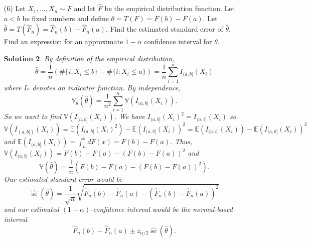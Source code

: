 \documentclass[10pt]{article}
\newtheorem*{sol}{Solution}
\newcommand{\V}{\mathbb{V}}
\newcommand{\E}{\mathbb{E}}
\newcommand{\se}{\operatorname{se}}
\newcommand{\Cov}{\operatorname{Cov}}
\begin{document}
\begin{enumerate}
\begin{sol}
We have $\Cov(\hat F_n(x), \hat F_n(y))=\frac{1}{n^2} \sum_{i,j} \Cov(Y_i, Z_j)$.
If $i\neq j$ then $Y_i$ and $Z_j$ are
independent so $\Cov(Y_i,Z_j)=0$. Otherwise, note
that $\Cov(Y_i,Z_i) = \E(Y_i Z_i) - \E(Y_i)\E(Z_i)$ and
\[
\E(Y_i) = \int I(z\leq x) dF(z) = \int_{-\infty}^x dF(z) = F(x)
\text{ and similarly }
\E(Z_i) = F(y).
\]
Without loss of generality, assume that $x<y$.
For $\E(Y_iZ_i)$, note that if $X_i>x$ then $Y_iZ_i=0$ since $Y_i=0$.
If $X_i\leq x$ then $Y_iZ_i=1$. So in fact $Y_iZ_i=Y_i$.
Thus,
\[
\Cov(Y_i,Z_i) = \E(Y_i) - \E(Y_i)\E(Z_i) = F(x) - F(x)F(y).
\]

Plugging this into our formula yields
\[
\Cov(\hat F_n(x), \hat F_n(y)) =
\begin{cases}
\frac{F(x)}{n}(1- F(y)) & x < y \\
\frac{F(y)}{n}(1-F(x)) & y > x.
\end{cases}
\]
\end{sol}

\item[(6)]
Let $X_1, \ldots, X_n \sim F$ and let $\hat F$ be the empirical distribution
function. Let $a < b$ be fixed numbers and define $\theta = T(F) = F(b) - F(a)$.
Let $\hat \theta = T(\hat F_n) = \hat F_n(b) - \hat F_n(a)$.
Find the estimated standard error of $\hat \theta$.
Find an expression for an approximate $1 - \alpha$ confidence
interval for $\theta$.

\begin{sol}
By definition of the empirical distribution,
\[
\hat \theta = \frac{1}{n} (\#\{i : X_i \leq b\} - \#\{i : X_i \leq a\})
=\frac{1}{n} \sum_{i=1}^n I_{(a,b]}(X_i)
\]
where $I_*$ denotes an indicator function. By independence,
\[
\V_\theta(\hat \theta) = \frac{1}{n^2} \sum_{i=1}^n \V(I_{(a,b]}(X_i)).
\]
So we want to find $\V(I_{(a,b]}(X_i))$. We have $I_{(a,b]}(X_i)^2=I_{(a,b]}(X_i)$
so
\[
\V(I_{(a,b])}(X_i)) = \E(I_{(a,b]}(X_i)^2) - \E(I_{(a,b]}(X_i))^2
= \E(I_{(a,b]}(X_i)) - \E(I_{(a,b]}(X_i))^2
\]
and $\E(I_{(a,b]}(X_i))=\int_a^b dF(x)=F(b)-F(a)$. Thus,
$\V(I_{(a,b]}(X_i))=F(b)-F(a) - (F(b)-F(a))^2$ and
\[
\V(\hat \theta) = \frac{1}{n}\left(F(b)-F(a) - \left(F(b)-F(a)\right)^2\right).
\]
Our estimated standard error would be
\[
\widehat{\se}(\hat \theta) = \frac{1}{\sqrt{n}}\sqrt{\hat F_n(b) - \hat F_n(a) -
(\hat F_n(b) - \hat F_n(a))^2}
\]
and our estimated $(1-\alpha)$-confidence interval would be the normal-based
interval
\[
\hat F_n(b) - \hat F_n(a) \pm z_{\alpha/2}\widehat{\se}(\hat \theta).
\]
\end{sol}


\end{enumerate}
\end{document}
